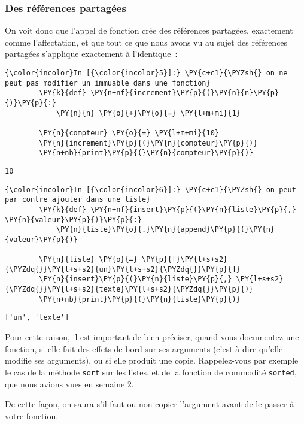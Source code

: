     \hypertarget{des-ruxe9fuxe9rences-partaguxe9es}{%
\subsubsection{Des références
partagées}\label{des-ruxe9fuxe9rences-partaguxe9es}}

    On voit donc que l'appel de fonction crée des références partagées,
exactement comme l'affectation, et que tout ce que nous avons vu au
sujet des références partagées s'applique exactement à l'identique~:

    \begin{Verbatim}[commandchars=\\\{\}]
{\color{incolor}In [{\color{incolor}5}]:} \PY{c+c1}{\PYZsh{} on ne peut pas modifier un immuable dans une fonction}
        \PY{k}{def} \PY{n+nf}{increment}\PY{p}{(}\PY{n}{n}\PY{p}{)}\PY{p}{:}
            \PY{n}{n} \PY{o}{+}\PY{o}{=} \PY{l+m+mi}{1}
        
        \PY{n}{compteur} \PY{o}{=} \PY{l+m+mi}{10}
        \PY{n}{increment}\PY{p}{(}\PY{n}{compteur}\PY{p}{)}
        \PY{n+nb}{print}\PY{p}{(}\PY{n}{compteur}\PY{p}{)}
\end{Verbatim}


    \begin{Verbatim}[commandchars=\\\{\}]
10

    \end{Verbatim}

    \begin{Verbatim}[commandchars=\\\{\}]
{\color{incolor}In [{\color{incolor}6}]:} \PY{c+c1}{\PYZsh{} on peut par contre ajouter dans une liste}
        \PY{k}{def} \PY{n+nf}{insert}\PY{p}{(}\PY{n}{liste}\PY{p}{,} \PY{n}{valeur}\PY{p}{)}\PY{p}{:}
            \PY{n}{liste}\PY{o}{.}\PY{n}{append}\PY{p}{(}\PY{n}{valeur}\PY{p}{)}
            
        \PY{n}{liste} \PY{o}{=} \PY{p}{[}\PY{l+s+s2}{\PYZdq{}}\PY{l+s+s2}{un}\PY{l+s+s2}{\PYZdq{}}\PY{p}{]}
        \PY{n}{insert}\PY{p}{(}\PY{n}{liste}\PY{p}{,} \PY{l+s+s2}{\PYZdq{}}\PY{l+s+s2}{texte}\PY{l+s+s2}{\PYZdq{}}\PY{p}{)}
        \PY{n+nb}{print}\PY{p}{(}\PY{n}{liste}\PY{p}{)}
\end{Verbatim}


    \begin{Verbatim}[commandchars=\\\{\}]
['un', 'texte']

    \end{Verbatim}

    Pour cette raison, il est important de bien préciser, quand vous
documentez une fonction, si elle fait des effets de bord sur ses
arguments (c'est-à-dire qu'elle modifie ses arguments), ou si elle
produit une copie. Rappelez-vous par exemple le cas de la méthode
\texttt{sort} sur les listes, et de la fonction de commodité
\texttt{sorted}, que nous avions vues en semaine 2.

De cette façon, on saura s'il faut ou non copier l'argument avant de le
passer à votre fonction.


    
    
    
